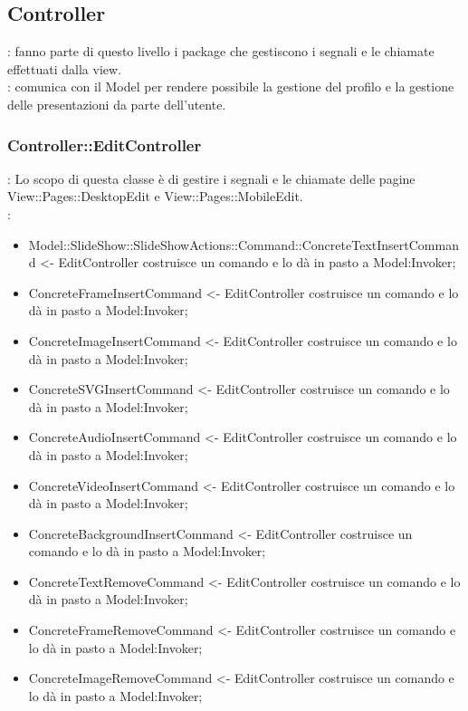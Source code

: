 \subsection{Controller}{
	\textbf{\tipo}: fanno parte di questo livello i package che gestiscono i segnali e le chiamate effettuati dalla view.\\
	\textbf{\relaz}: comunica con il Model per rendere possibile la gestione del profilo e la gestione delle presentazioni da parte dell'utente.\\
	
	\subsubsection{Controller::\-EditController}{
		\textbf{\tipo}: Lo scopo di questa classe è di gestire i segnali e le chiamate delle pagine View::\-Pages::\-DesktopEdit e View::\-Pages::\-MobileEdit.\\	
		\textbf{\relaz}:
		\begin{itemize}
			\item Model::\-SlideShow::\-SlideShowActions::\-Command::\-ConcreteTextInsertCommand <- EditController costruisce un comando e lo dà in pasto a Model:Invoker;
			\item ConcreteFrameInsertCommand <- EditController costruisce un comando e lo dà in pasto a Model:Invoker;
			\item ConcreteImageInsertCommand <- EditController costruisce un comando e lo dà in pasto a Model:Invoker;
			\item ConcreteSVGInsertCommand <- EditController costruisce un comando e lo dà in pasto a Model:Invoker;
			\item ConcreteAudioInsertCommand <- EditController costruisce un comando e lo dà in pasto a Model:Invoker;
			\item ConcreteVideoInsertCommand <- EditController costruisce un comando e lo dà in pasto a Model:Invoker;
			\item ConcreteBackgroundInsertCommand <- EditController costruisce un comando e lo dà in pasto a Model:Invoker;
			\item ConcreteTextRemoveCommand <- EditController costruisce un comando e lo dà in pasto a Model:Invoker;
			\item ConcreteFrameRemoveCommand <- EditController costruisce un comando e lo dà in pasto a Model:Invoker;
			\item ConcreteImageRemoveCommand <- EditController costruisce un comando e lo dà in pasto a Model:Invoker;

\end{itemize}}}
